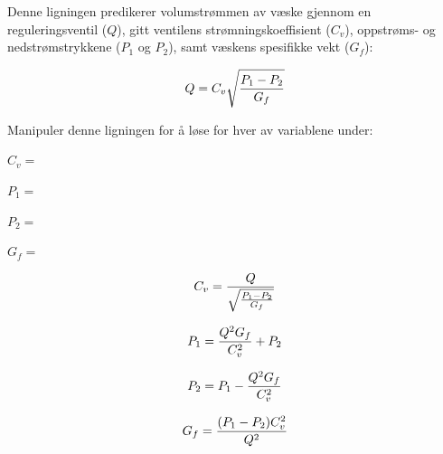 

Denne ligningen predikerer volumstrømmen av væske gjennom en reguleringsventil ($Q$), gitt ventilens strømningskoeffisient ($C_v$), oppstrøms- og nedstrømstrykkene ($P_1$ og $P_2$), samt væskens spesifikke vekt ($G_f$):

$$Q = C_v \sqrt{P_1 - P_2 \over G_f}$$

Manipuler denne ligningen for å løse for hver av variablene under:

\vskip 10pt

$C_v =$

\vskip 10pt

$P_1 =$

\vskip 10pt

$P_2 =$

\vskip 10pt

$G_f =$

\vskip 10pt







$$C_v = {Q \over \sqrt{P_1 - P_2 \over G_f}}$$

\vskip 20pt

$$P_1 = {Q^2 G_f \over C_v^2} + P_2$$

\vskip 20pt

$$P_2 = P_1 - {Q^2 G_f \over C_v^2}$$

\vskip 20pt

$$G_f = {(P_1 - P_2) C_v^2 \over Q^2}$$










